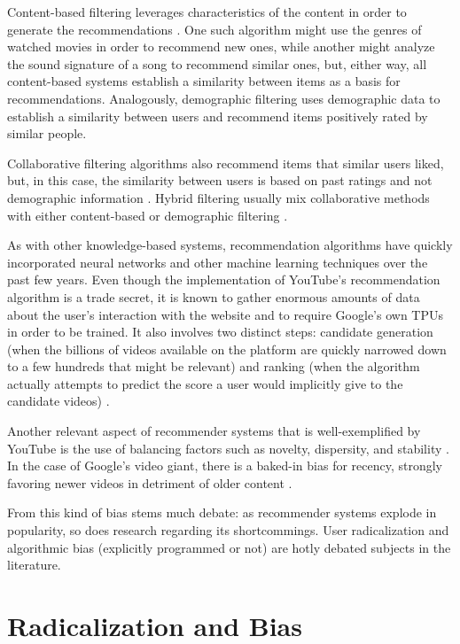 Content-based filtering leverages characteristics of the content in order to
generate the recommendations \citep{ricci_introduction_2011}. One such algorithm
might use the genres of watched movies in order to recommend new ones, while
another might analyze the sound signature of a song to recommend similar ones,
but, either way, all content-based systems establish a similarity between items
as a basis for recommendations. Analogously, demographic filtering uses
demographic data to establish a similarity between users and recommend items
positively rated by similar people.

Collaborative filtering algorithms also recommend items that similar users
liked, but, in this case, the similarity between users is based on past ratings
and not demographic information \citep{ricci_introduction_2011}. Hybrid
filtering usually mix collaborative methods with either content-based or
demographic filtering \citep{ricci_introduction_2011}.

As with other knowledge-based systems, recommendation algorithms have quickly
incorporated neural networks and other machine learning techniques over the past
few years. Even though the implementation of YouTube's recommendation algorithm
is a trade secret, it is known to gather enormous amounts of data about the
user's interaction with the website and to require Google's own TPUs in order to
be trained. It also involves two distinct steps: candidate generation (when the
billions of videos available on the platform are quickly narrowed down to a few
hundreds that might be relevant) and ranking (when the algorithm actually
attempts to predict the score a user would implicitly give to the candidate
videos) \citep{anonymous_improving_2022}.

Another relevant aspect of recommender systems that is well-exemplified by
YouTube is the use of balancing factors such as novelty, dispersity, and
stability \citep{zhao_recommending_2019}. In the case of Google's video giant,
there is a baked-in bias for recency, strongly favoring newer videos in
detriment of older content \citep{zhao_recommending_2019}.

From this kind of bias stems much debate: as recommender systems explode in
popularity, so does research regarding its shortcommings. User radicalization
and algorithmic bias (explicitly programmed or not) are hotly debated subjects
in the literature.

\section{Radicalization and Bias}
\label{sec:radicalization_bias}

